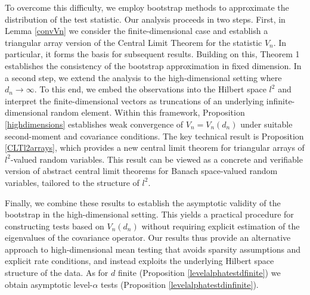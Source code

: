 \documentclass[sn-mathphys,Numbered]{sn-jnl}%
\theoremstyle{thmstyleone}%
\theoremstyle{thmstyletwo}%
\theoremstyle{thmstylethree}%
\begin{document}
To overcome this difficulty, we employ bootstrap methods to approximate the distribution of the test statistic. Our analysis proceeds in two steps. First, in Lemma \ref{convVn} we consider the finite-dimensional case and establish a triangular array version of the Central Limit Theorem for the statistic $V_n$.
In particular, it forms the basis for subsequent results. Building on this, Theorem 1 establishes the consistency of the bootstrap approximation in fixed dimension.
In a second step, we extend the analysis to the high-dimensional setting where $d_n \rightarrow \infty.$
To this end, we embed the observations into the Hilbert space $l^2$
and interpret the finite-dimensional vectors as truncations of an underlying infinite-dimensional random element. Within this framework, Proposition \ref{highdimensions} establishes weak convergence of $V_n=V_n(d_n)$ under suitable second-moment and covariance conditions. The key technical result is Proposition \ref{CLTl2arrays}, which provides a new central limit theorem for triangular arrays of $l^2$-valued random variables. This result can be viewed as a concrete and verifiable version of abstract central limit theorems for Banach space-valued random variables, tailored to the structure of $l^2$.

Finally, we combine these results to establish the asymptotic validity of the bootstrap in the high-dimensional setting. This yields a practical procedure for constructing tests based on $V_n(d_n)$ without requiring explicit estimation of the eigenvalues of the covariance operator. Our results thus provide an alternative approach to high-dimensional mean testing that avoids sparsity assumptions and explicit rate conditions, and instead exploits the underlying Hilbert space structure of the data. As for $d$ finite (Proposition \ref{levelalphatestdfinite}) we obtain asymptotic level-$\alpha$ tests (Proposition \ref{levelalphatestdinfinite}).
\end{document}
